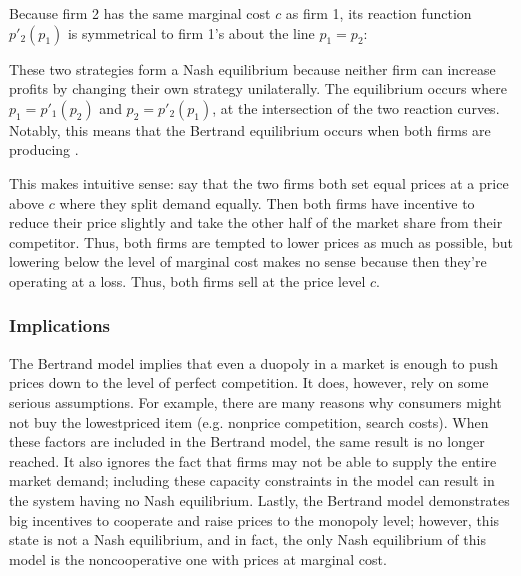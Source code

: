 \documentclass[letterpaper,10pt,english]{jupyterBook}
\begin{document}
\noindent{}

\sphinxAtStartPar
Because firm 2 has the same marginal cost \(c\) as firm 1, its reaction function \(p'_2(p_1)\) is symmetrical to firm 1’s about the line \(p_1 = p_2\):

\noindent{}

\sphinxAtStartPar
These two strategies form a Nash equilibrium because neither firm can increase profits by changing their own strategy unilaterally. The equilibrium occurs where \(p_1 = p'_1(p_2)\) and \(p_2 = p'_2(p_1)\), at the intersection of the two reaction curves. Notably, this means that the Bertrand equilibrium occurs when both firms are producing .

\sphinxAtStartPar
This makes intuitive sense: say that the two firms both set equal prices at a price above \(c\) where they split demand equally. Then both firms have incentive to reduce their price slightly and take the other half of the market share from their competitor. Thus, both firms are tempted to lower prices as much as possible, but lowering below the level of marginal cost makes no sense because then they’re operating at a loss. Thus, both firms sell at the price level \(c\).


\subsubsection{Implications}
\label{\detokenize{content/07-game-theory/bertrand:implications}}
\sphinxAtStartPar
The Bertrand model implies that even a duopoly in a market is enough to push prices down to the level of perfect competition. It does, however, rely on some serious assumptions. For example, there are many reasons why consumers might not buy the lowest\sphinxhyphen{}priced item (e.g. non\sphinxhyphen{}price competition, search costs). When these factors are included in the Bertrand model, the same result is no longer reached. It also ignores the fact that firms may not be able to supply the entire market demand; including these capacity constraints in the model can result in the system having no Nash equilibrium. Lastly, the Bertrand model demonstrates big incentives to cooperate and raise prices to the monopoly level; however, this state is not a Nash equilibrium, and in fact, the only Nash equilibrium of this model is the non\sphinxhyphen{}cooperative one with prices at marginal cost.
\end{document}
